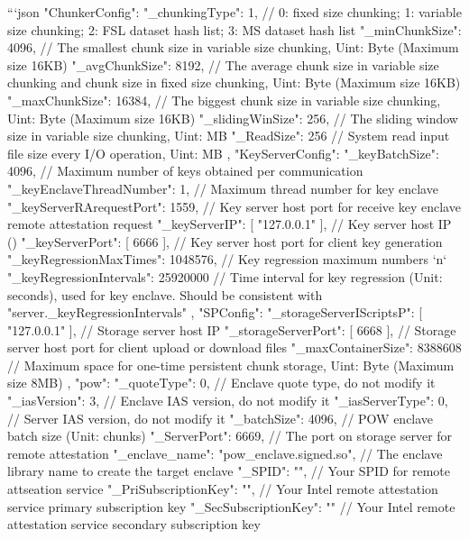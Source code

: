 ```json
{
    "ChunkerConfig": {
        "\_chunkingType": 1, // 0: fixed size chunking; 1: variable size chunking; 2: FSL dataset hash list; 3: MS dataset hash list
        "\_minChunkSize": 4096, // The smallest chunk size in variable size chunking, Uint: Byte (Maximum size 16KB)
        "\_avgChunkSize": 8192, // The average chunk size in variable size chunking and chunk size in fixed size chunking, Uint: Byte (Maximum size 16KB)
        "\_maxChunkSize": 16384, // The biggest chunk size in variable size chunking, Uint: Byte (Maximum size 16KB)
        "\_slidingWinSize": 256, // The sliding window size in variable size chunking, Uint: MB
        "\_ReadSize": 256 // System read input file size every I/O operation, Uint: MB
    },
    "KeyServerConfig": {
        "\_keyBatchSize": 4096, // Maximum number of keys obtained per communication
        "\_keyEnclaveThreadNumber": 1, // Maximum thread number for key enclave
        "\_keyServerRArequestPort": 1559, // Key server host port for receive key enclave remote attestation request 
        "\_keyServerIP": [
            "127.0.0.1"
        ], // Key server host IP ()
        "\_keyServerPort": [
            6666
        ], // Key server host port for client key generation
        "\_keyRegressionMaxTimes": 1048576, // Key regression maximum numbers `n`
        "\_keyRegressionIntervals": 25920000 // Time interval for key regression (Unit: seconds), used for key enclave. Should be consistent with "server.\_keyRegressionIntervals"
    },
    "SPConfig": {
        "\_storageServerIScriptsP": [
            "127.0.0.1"
        ], // Storage server host IP
        "\_storageServerPort": [
            6668
        ], // Storage server host port for client upload or download files
        "\_maxContainerSize": 8388608 // Maximum space for one-time persistent chunk storage, Uint: Byte (Maximum size 8MB)
    },
    "pow": {
        "\_quoteType": 0, // Enclave quote type, do not modify it 
        "\_iasVersion": 3, // Enclave IAS version, do not modify it 
        "\_iasServerType": 0, // Server IAS version, do not modify it
        "\_batchSize": 4096, // POW enclave batch size (Unit: chunks)
        "\_ServerPort": 6669, // The port on storage server for remote attestation
        "\_enclave\_name": "pow\_enclave.signed.so", // The enclave library name to create the target enclave
        "\_SPID": "", // Your SPID for remote attseation service
        "\_PriSubscriptionKey": "", // Your Intel remote attestation service primary subscription key
        "\_SecSubscriptionKey": "" // Your Intel remote attestation service secondary subscription key
}}
